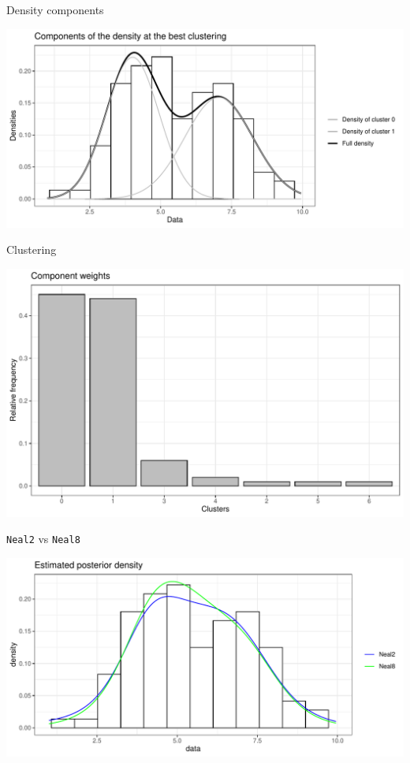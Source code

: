 \begin{frame}{Density components}

\begin{center}
		\includegraphics[scale=0.6]{etc/componentsM025m3_best.pdf}
	\end{center}
\end{frame}


\begin{frame}{Clustering}

\begin{center}
		\includegraphics[scale=0.5]{etc/barplotM1m3.pdf}
	\end{center}
\end{frame}



\begin{frame}{\texttt{Neal2} vs \texttt{Neal8}}

\begin{center}
		\includegraphics[scale=0.5]{etc/neal2_M10.pdf}
	\end{center}
	
\end{frame}

